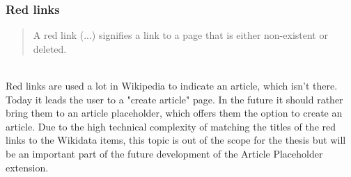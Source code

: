 \documentclass[11pt]{article}
\begin{document}
\subsubsection{Red links}
\begin{quotation}
A red link (...) signifies a link to a page that is either non-existent or deleted. 
\end{quotation} \cite{wiki:01} %
\\
Red links are used a lot in Wikipedia to indicate an article, which isn't there. Today it leads the user to a "create article" page. In the future it should rather bring them to an article placeholder, which offers them the option to create an article. Due to the high technical complexity of matching the titles of the red links to the Wikidata items, this topic is out of the scope for the thesis but will be an important part of the future development of the Article Placeholder extension. 
\end{document}
